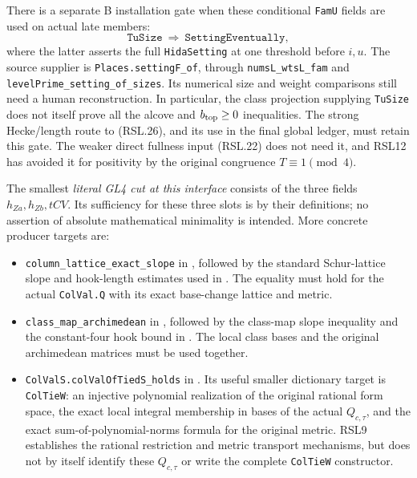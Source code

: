 There is a separate B installation gate when these conditional
\texttt{FamU} fields are used on actual late members:
\[
       \texttt{TuSize}\ \Longrightarrow\
       \texttt{SettingEventually},
                                                                  \tag{RSL.28}
\]
where the latter asserts the full \texttt{HidaSetting} at
one threshold before $i,u$.  The source supplier is
\texttt{Places.settingF\_of}, through
\texttt{numsL\_wtsL\_fam} and
\texttt{levelPrime\_setting\_of\_sizes}.
Its numerical size and weight comparisons still need a human
reconstruction.  In particular, the class projection supplying
\texttt{TuSize} does not itself prove all the alcove and
$b_{\rm top}\ge0$ inequalities.  The strong Hecke/length route
to (RSL.26), and its use in the final global ledger, must retain
this gate.  The weaker direct fullness input (RSL.22) does not
need it, and RSL12 has avoided it for positivity by the original
congruence $T\equiv1\pmod4$.

The smallest \emph{literal GL4 cut at this interface} consists
of the three fields $h_{Za},h_{Zb},tCV$.  Its sufficiency for
these three slots is by their definitions; no assertion of
absolute mathematical minimality is intended.  More concrete
producer targets are:
\begingroup\raggedright
\begin{itemize}
\item \texttt{column\_lattice\_exact\_slope}
in , followed by
the standard Schur-lattice slope and hook-length estimates
used in .
The equality must hold for the actual \texttt{ColVal.Q}
with its exact base-change lattice and metric.
\item \texttt{class\_map\_archimedean}
in , followed by the
class-map slope inequality and the constant-four hook bound
in .  The local class bases and
the original archimedean matrices must be used together.
\item \texttt{ColValS.colValOfTiedS\_holds} in
.
Its useful smaller dictionary target is
\texttt{ColTieW}: an injective polynomial realization of
the original rational form space, the exact local integral
membership in bases of the actual $Q_{c,\tau}$, and the
exact sum-of-polynomial-norms formula for the original
metric.  RSL9 establishes the rational restriction and
metric transport mechanisms, but does not by itself
identify these $Q_{c,\tau}$ or write the complete
\texttt{ColTieW} constructor.
\end{itemize}
\endgroup

